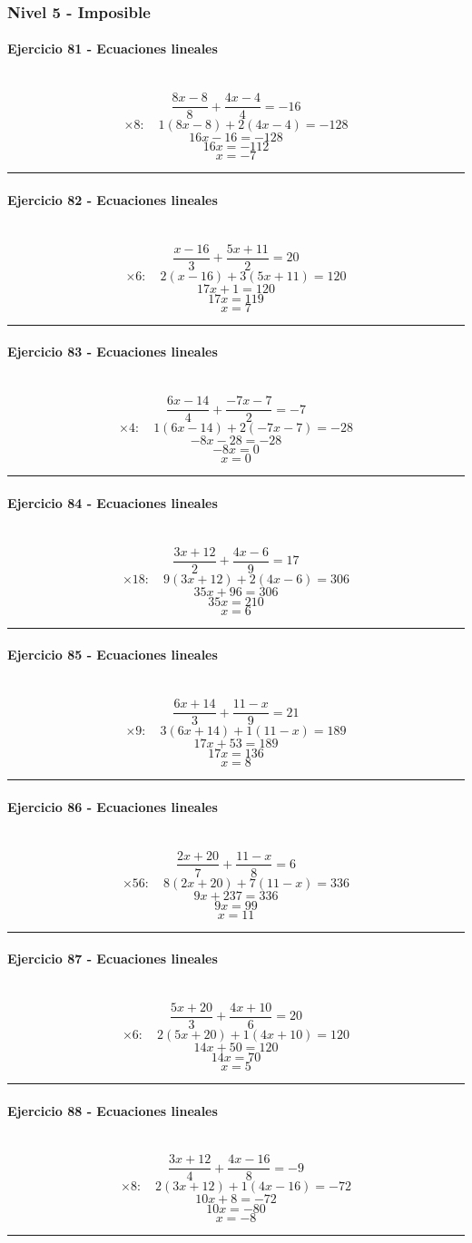 \documentclass[10pt,a4paper]{article}
\newcommand{\res}[1]{\paragraph{#1}\mbox{}\\[-1.2em]}
\begin{document}
\subsubsection*{Nivel 5 - Imposible}
\res{Ejercicio 81 - Ecuaciones lineales}
\[ \frac{8 x - 8}{8}+\frac{4 x - 4}{4}=-16 \]
\[ \times 8:\quad 1(8 x - 8)+2(4 x - 4)=-128 \]
\[ 16 x - 16=-128 \]
\[ 16x=-112 \]
\[ \boxed{x=-7} \]
\vspace{1mm}\hrule\vspace{2mm}
\res{Ejercicio 82 - Ecuaciones lineales}
\[ \frac{x - 16}{3}+\frac{5 x + 11}{2}=20 \]
\[ \times 6:\quad 2(x - 16)+3(5 x + 11)=120 \]
\[ 17 x + 1=120 \]
\[ 17x=119 \]
\[ \boxed{x=7} \]
\vspace{1mm}\hrule\vspace{2mm}
\res{Ejercicio 83 - Ecuaciones lineales}
\[ \frac{6 x - 14}{4}+\frac{- 7 x - 7}{2}=-7 \]
\[ \times 4:\quad 1(6 x - 14)+2(- 7 x - 7)=-28 \]
\[ - 8 x - 28=-28 \]
\[ -8x=0 \]
\[ \boxed{x=0} \]
\vspace{1mm}\hrule\vspace{2mm}
\res{Ejercicio 84 - Ecuaciones lineales}
\[ \frac{3 x + 12}{2}+\frac{4 x - 6}{9}=17 \]
\[ \times 18:\quad 9(3 x + 12)+2(4 x - 6)=306 \]
\[ 35 x + 96=306 \]
\[ 35x=210 \]
\[ \boxed{x=6} \]
\vspace{1mm}\hrule\vspace{2mm}
\res{Ejercicio 85 - Ecuaciones lineales}
\[ \frac{6 x + 14}{3}+\frac{11 - x}{9}=21 \]
\[ \times 9:\quad 3(6 x + 14)+1(11 - x)=189 \]
\[ 17 x + 53=189 \]
\[ 17x=136 \]
\[ \boxed{x=8} \]
\vspace{1mm}\hrule\vspace{2mm}
\res{Ejercicio 86 - Ecuaciones lineales}
\[ \frac{2 x + 20}{7}+\frac{11 - x}{8}=6 \]
\[ \times 56:\quad 8(2 x + 20)+7(11 - x)=336 \]
\[ 9 x + 237=336 \]
\[ 9x=99 \]
\[ \boxed{x=11} \]
\vspace{1mm}\hrule\vspace{2mm}
\res{Ejercicio 87 - Ecuaciones lineales}
\[ \frac{5 x + 20}{3}+\frac{4 x + 10}{6}=20 \]
\[ \times 6:\quad 2(5 x + 20)+1(4 x + 10)=120 \]
\[ 14 x + 50=120 \]
\[ 14x=70 \]
\[ \boxed{x=5} \]
\vspace{1mm}\hrule\vspace{2mm}
\res{Ejercicio 88 - Ecuaciones lineales}
\[ \frac{3 x + 12}{4}+\frac{4 x - 16}{8}=-9 \]
\[ \times 8:\quad 2(3 x + 12)+1(4 x - 16)=-72 \]
\[ 10 x + 8=-72 \]
\[ 10x=-80 \]
\[ \boxed{x=-8} \]
\vspace{1mm}\hrule\vspace{2mm}
\end{document}

